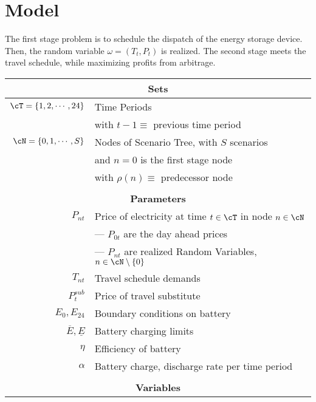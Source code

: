 \section*{Model}
The first stage problem is to schedule the dispatch of the energy storage device.  Then, the random variable $\omega = ( T_t, P_t )$ is realized.  The second stage meets the travel schedule, while maximizing profits from arbitrage.


{  \centering

\begin{longtable}{ r l }
\multicolumn{2}{c}{\bf Sets}		\\
\hline
$ \cT = \left\{ 1, 2, \cdots, 24 \right\} $	& Time Periods \\
					& with $t-1 \equiv$ previous time period	\\
$ \cN = \left\{ 0, 1, \cdots, S \right\}  $	& Nodes of Scenario Tree, with $S$ scenarios \\
					& and $n = 0$ is the first stage node\\
					& with $\rho(n) \equiv$ predecessor node  \\
 	&	\\

\multicolumn{2}{c}{\bf Parameters}		\\
\hline
$ P_{nt} $		&	Price of electricity at time $t \in \cT$ in node $n \in \cN$	\\
			&	--- $P_{0t}$ are the day ahead prices 	\\
			&	--- $P_{nt}$ are realized Random Variables, $n \in \cN \setminus \left\{ 0 \right\}$ \\
$ T_{nt} $		&	Travel schedule demands	\\
$P^{sub}_t$		&	Price of travel substitute	\\
$ E_{0}, E_{24}$	&	Boundary conditions on battery	\\
$\overline{E},\underline{E}$&Battery charging limits		\\
$\eta$			&	Efficiency of battery	\\
$\alpha$	&	Battery charge, discharge rate per time period  \\
	&	\\

\multicolumn{2}{c}{\bf Variables}		\\
\hline


\end{longtable}}
